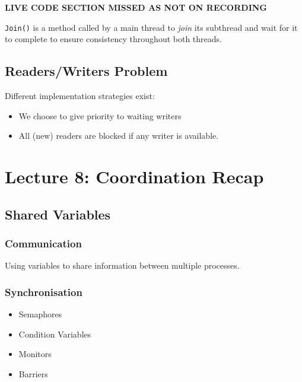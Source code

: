 \documentclass{article}
\begin{document}
\textbf{LIVE CODE SECTION MISSED AS NOT ON RECORDING} 

\texttt{Join()} is a method called by a main thread to \emph{join} its subthread and wait for it to complete to ensure consistency throughout both threads.

\subsection{Readers/Writers Problem}
\label{sec:org4df4cdb}
Different implementation strategies exist:
\begin{itemize}
\item We choose to give priority to waiting writers
\item All (new) readers are blocked if any writer is available.
\end{itemize}

\maketitle
\section{Lecture 8: Coordination Recap}


\subsection{Shared Variables}
\label{sec:org537843f}
\subsubsection{Communication}
\label{sec:org0cd1e6c}
Using variables to share information between multiple processes.

\subsubsection{Synchronisation}
\label{sec:orgcb3d49e}
\begin{itemize}
\item Semaphores
\item Condition Variables
\item Monitors
\item Barriers
\end{itemize}

\maketitle
\end{document}
